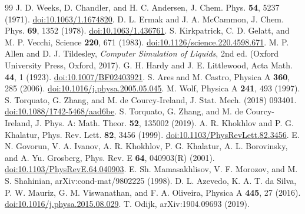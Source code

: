 \documentclass[11pt]{article}
\begin{document}
\begin{thebibliography}{99}
 J. D. Weeks, D. Chandler, and H. C. Andersen, J. Chem. Phys. \textbf{54}, 5237 (1971). \href{https://doi.org/10.1063/1.1674820}{doi:10.1063/1.1674820}.
 D. L. Ermak and J. A. McCammon, J. Chem. Phys. \textbf{69}, 1352 (1978). \href{https://doi.org/10.1063/1.436761}{doi:10.1063/1.436761}.
 S. Kirkpatrick, C. D. Gelatt, and M. P. Vecchi, Science \textbf{220}, 671 (1983). \href{https://doi.org/10.1126/science.220.4598.671}{doi:10.1126/science.220.4598.671}.
 M. P. Allen and D. J. Tildesley, \emph{Computer Simulation of Liquids}, 2nd ed. (Oxford University Press, Oxford, 2017).
 G. H. Hardy and J. E. Littlewood, Acta Math. \textbf{44}, 1 (1923). \href{https://doi.org/10.1007/BF02403921}{doi:10.1007/BF02403921}.
 S. Ares and M. Castro, Physica A \textbf{360}, 285 (2006). \href{https://doi.org/10.1016/j.physa.2005.05.045}{doi:10.1016/j.physa.2005.05.045}.
 M. Wolf, Physica A \textbf{241}, 493 (1997).
 S. Torquato, G. Zhang, and M. de Courcy-Ireland, J. Stat. Mech. (2018) 093401. \href{https://doi.org/10.1088/1742-5468/aad6be}{doi:10.1088/1742-5468/aad6be}.
 S. Torquato, G. Zhang, and M. de Courcy-Ireland, J. Phys. A: Math. Theor. \textbf{52}, 135002 (2019).
 A. R. Khokhlov and P. G. Khalatur, Phys. Rev. Lett. \textbf{82}, 3456 (1999). \href{https://doi.org/10.1103/PhysRevLett.82.3456}{doi:10.1103/PhysRevLett.82.3456}.
 E. N. Govorun, V. A. Ivanov, A. R. Khokhlov, P. G. Khalatur, A. L. Borovinsky, and A. Yu. Grosberg, Phys. Rev. E \textbf{64}, 040903(R) (2001). \href{https://doi.org/10.1103/PhysRevE.64.040903}{doi:10.1103/PhysRevE.64.040903}.
 E. Sh. Mamasakhlisov, V. F. Morozov, and M. S. Shahinian, arXiv:cond-mat/9802225 (1998).
 D. L. Azevedo, K. A. T. da Silva, P. W. Mauriz, G. M. Viswanathan, and F. A. Oliveira, Physica A \textbf{445}, 27 (2016). \href{https://doi.org/10.1016/j.physa.2015.08.029}{doi:10.1016/j.physa.2015.08.029}.
 T. Odijk, arXiv:1904.09693 (2019).
\end{thebibliography}
\end{document}
